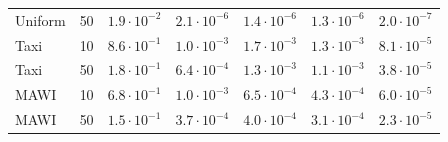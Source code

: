 \begin{tabular}{llrrrrr}
Uniform & 50 & $1.9\!\cdot\!10^{-2}$ & $2.1\!\cdot\!10^{-6}$ & $1.4\!\cdot\!10^{-6}$ & $1.3\!\cdot\!10^{-6}$ & $2.0\!\cdot\!10^{-7}$ \\
Taxi & 10 & $8.6\!\cdot\!10^{-1}$ & $1.0\!\cdot\!10^{-3}$ & $1.7\!\cdot\!10^{-3}$ & $1.3\!\cdot\!10^{-3}$ & $8.1\!\cdot\!10^{-5}$ \\
Taxi & 50 & $1.8\!\cdot\!10^{-1}$ & $6.4\!\cdot\!10^{-4}$ & $1.3\!\cdot\!10^{-3}$ & $1.1\!\cdot\!10^{-3}$ & $3.8\!\cdot\!10^{-5}$ \\
MAWI & 10 & $6.8\!\cdot\!10^{-1}$ & $1.0\!\cdot\!10^{-3}$ & $6.5\!\cdot\!10^{-4}$ & $4.3\!\cdot\!10^{-4}$ & $6.0\!\cdot\!10^{-5}$ \\
MAWI & 50 & $1.5\!\cdot\!10^{-1}$ & $3.7\!\cdot\!10^{-4}$ & $4.0\!\cdot\!10^{-4}$ & $3.1\!\cdot\!10^{-4}$ & $2.3\!\cdot\!10^{-5}$ \\
\bottomrule
\end{tabular}
